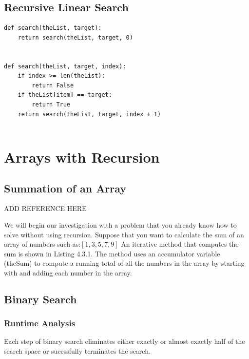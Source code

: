 \subsection{Recursive Linear Search}




\begin{verbatim}
def search(theList, target):
	return search(theList, target, 0)


def search(theList, target, index):
	if index >= len(theList):
		return False 
	if theList[item] == target:
		return True
	return search(theList, target, index + 1)
	
\end{verbatim}


\section{Arrays with Recursion}


\subsection{Summation of an Array}
ADD REFERENCE HERE


We will begin our investigation with a problem that you already know how to solve without using recursion. Suppose that you want to calculate the sum of an array of numbers such as:$[1, 3, 5, 7, 9]$ An iterative method that computes the sum is shown in Listing 4.3.1. The method uses an accumulator variable (theSum) to compute a running total of all the numbers in the array by starting with and adding each number in the array.



\subsection{Binary Search}






\subsubsection{Runtime Analysis}
Each step of binary search eliminates either exactly or almost exactly half of the search space or sucessfully terminates the search.

